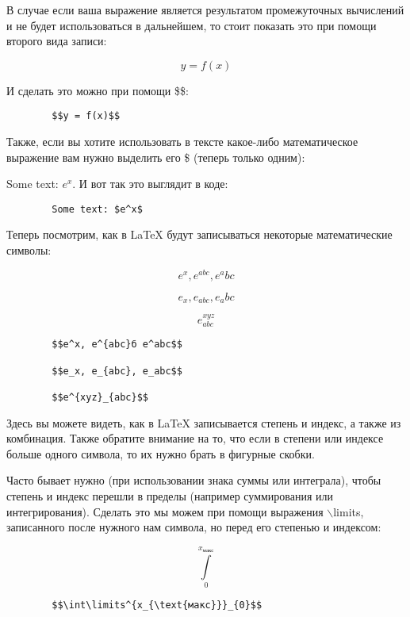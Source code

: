     В случае если ваша выражение является результатом промежуточных вычислений и не будет использоваться в дальнейшем, то стоит показать это при помощи второго вида записи:
    
    $$y = f(x)$$    
    
    И сделать это можно при помощи \$\$:    
    
    \begin{verbatim}
        $$y = f(x)$$
    \end{verbatim}
    
    Также, если вы хотите использовать в тексте какое-либо математическое выражение вам нужно выделить его \$ (теперь только одним):

    Some text: $e^x$. И вот так это выглядит в коде:
    
    \begin{verbatim}
        Some text: $e^x$
    \end{verbatim}
    
    Теперь посмотрим, как в \LaTeX{} будут записываться некоторые математические символы:
    
    $$e^x, e^{abc}, e^abc$$
        
    $$e_x, e_{abc}, e_abc$$
    
    $$e^{xyz}_{abc}$$
    
    \begin{verbatim}
        $$e^x, e^{abc}б e^abc$$
        
        $$e_x, e_{abc}, e_abc$$
        
        $$e^{xyz}_{abc}$$
    \end{verbatim} 
    
    Здесь вы можете видеть, как в \LaTeX{} записывается степень и индекс, а также из комбинация. Также обратите внимание на то, что если в степени или индексе больше одного символа, то их нужно брать в фигурные скобки.
    
    Часто бывает нужно (при использовании знака суммы или интеграла), чтобы степень и индекс перешли в пределы (например суммирования или интегрирования). Сделать это мы можем при помощи выражения $\backslash$limits, записанного после нужного нам символа, но перед его степенью и индексом:
    
    $$\int\limits^{x_{\text{макс}}}_{0}$$
    
    \begin{verbatim}
        $$\int\limits^{x_{\text{макс}}}_{0}$$
    \end{verbatim}
    
